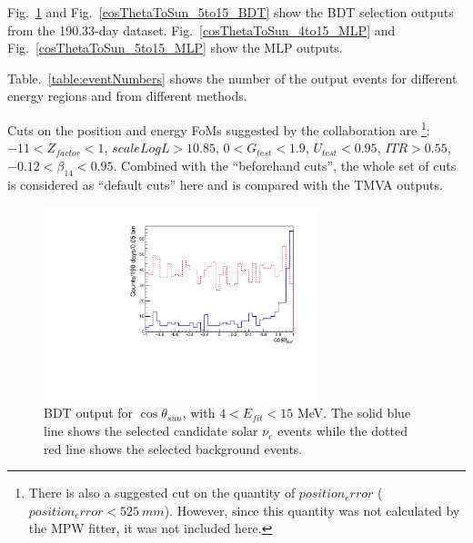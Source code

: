 Fig.~\ref{cosThetaToSun_4to15_BDT} and Fig.~\ref{cosThetaToSun_5to15_BDT} show the BDT selection outputs from the 190.33-day dataset. Fig.~\ref{cosThetaToSun_4to15_MLP} and Fig.~\ref{cosThetaToSun_5to15_MLP} show the MLP outputs. 

Table.~\ref{table:eventNumbers} shows the number of the output events for different energy regions and from different methods.

Cuts on the position and energy FoMs suggested by the collaboration\cite{morganFOM} are \footnote{There is also a suggested cut on the quantity of $position_error$ ($position_error<525~mm$). However, since this quantity was not calculated by the MPW fitter, it was not included here.}: $-11<Z_{factor}<1$, $scaleLogL>10.85$, $0<G_{test}<1.9$, $U_{test}<0.95$, $ITR>0.55$, $-0.12<\beta_{14}<0.95$. Combined with the ``beforehand cuts'', the whole set of cuts is considered as ``default cuts'' here and is compared with the TMVA outputs.

%

\begin{figure}[!htb]
	\centering
	\includegraphics[width=8cm]{cosThetaToSun_4to15_BDT.pdf}
	\caption[BDT output for $\cos\theta_{sun}$, with $4<E_{fit}<15$ MeV.]{BDT output for $\cos\theta_{sun}$, with $4<E_{fit}<15$ MeV. The solid blue line shows the selected candidate solar $\nu_e$ events while the dotted red line shows the selected background events.}
	\label{cosThetaToSun_4to15_BDT}
\end{figure}

